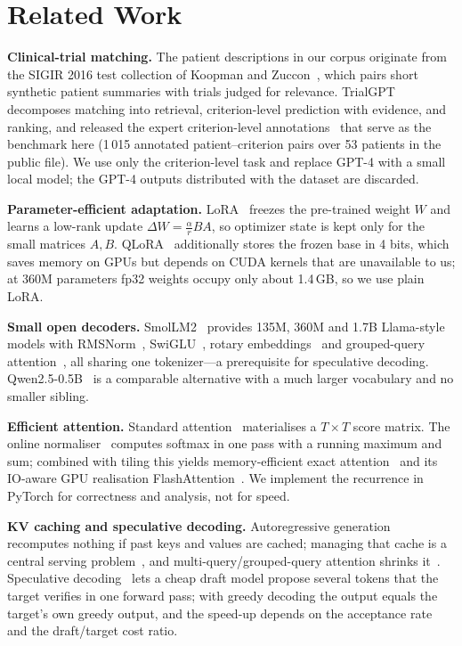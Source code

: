 \section{Related Work}
\textbf{Clinical-trial matching.} The patient descriptions in our corpus originate from the SIGIR 2016 test collection of Koopman and Zuccon~\cite{koopman2016sigir}, which pairs short synthetic patient summaries with trials judged for relevance. TrialGPT~\cite{jin2024trialgpt} decomposes matching into retrieval, criterion-level prediction with evidence, and ranking, and released the expert criterion-level annotations~\cite{ncbi2024dataset} that serve as the benchmark here (1\,015 annotated patient--criterion pairs over 53 patients in the public file). We use only the criterion-level task and replace GPT-4 with a small local model; the GPT-4 outputs distributed with the dataset are discarded.

\textbf{Parameter-efficient adaptation.} LoRA~\cite{hu2022lora} freezes the pre-trained weight $W$ and learns a low-rank update $\Delta W=\tfrac{\alpha}{r}BA$, so optimizer state is kept only for the small matrices $A,B$. QLoRA~\cite{dettmers2023qlora} additionally stores the frozen base in 4 bits, which saves memory on GPUs but depends on CUDA kernels that are unavailable to us; at 360M parameters fp32 weights occupy only about 1.4\,GB, so we use plain LoRA.

\textbf{Small open decoders.} SmolLM2~\cite{allal2025smollm2} provides 135M, 360M and 1.7B Llama-style~\cite{touvron2023llama} models with RMSNorm~\cite{zhang2019rmsnorm}, SwiGLU~\cite{shazeer2020glu}, rotary embeddings~\cite{su2024roformer} and grouped-query attention~\cite{ainslie2023gqa}, all sharing one tokenizer---a prerequisite for speculative decoding. Qwen2.5-0.5B~\cite{qwen2024qwen25} is a comparable alternative with a much larger vocabulary and no smaller sibling.

\textbf{Efficient attention.} Standard attention~\cite{vaswani2017attention} materialises a $T\times T$ score matrix. The online normaliser~\cite{milakov2018online} computes softmax in one pass with a running maximum and sum; combined with tiling this yields memory-efficient exact attention~\cite{rabe2021selfattention} and its IO-aware GPU realisation FlashAttention~\cite{dao2022flashattention}. We implement the recurrence in PyTorch for correctness and analysis, not for speed.

\textbf{KV caching and speculative decoding.} Autoregressive generation recomputes nothing if past keys and values are cached; managing that cache is a central serving problem~\cite{pope2023efficiently,kwon2023pagedattention}, and multi-query/grouped-query attention shrinks it~\cite{shazeer2019mqa,ainslie2023gqa}. Speculative decoding~\cite{leviathan2023speculative,chen2023speculative} lets a cheap draft model propose several tokens that the target verifies in one forward pass; with greedy decoding the output equals the target's own greedy output, and the speed-up depends on the acceptance rate and the draft/target cost ratio.
